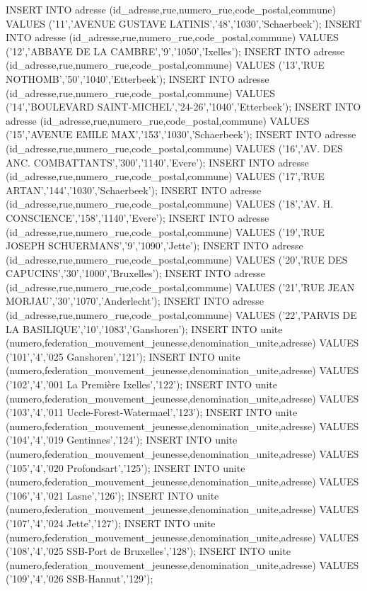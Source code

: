 INSERT INTO adresse (id_adresse,rue,numero_rue,code_postal,commune) VALUES ('11','AVENUE GUSTAVE LATINIS','48','1030','Schaerbeek');
INSERT INTO adresse (id_adresse,rue,numero_rue,code_postal,commune) VALUES ('12','ABBAYE DE LA CAMBRE','9','1050','Ixelles');
INSERT INTO adresse (id_adresse,rue,numero_rue,code_postal,commune) VALUES ('13','RUE NOTHOMB','50','1040','Etterbeek');
INSERT INTO adresse (id_adresse,rue,numero_rue,code_postal,commune) VALUES ('14','BOULEVARD SAINT-MICHEL','24-26','1040','Etterbeek');
INSERT INTO adresse (id_adresse,rue,numero_rue,code_postal,commune) VALUES ('15','AVENUE EMILE MAX','153','1030','Schaerbeek');
INSERT INTO adresse (id_adresse,rue,numero_rue,code_postal,commune) VALUES ('16','AV. DES ANC. COMBATTANTS','300','1140','Evere');
INSERT INTO adresse (id_adresse,rue,numero_rue,code_postal,commune) VALUES ('17','RUE ARTAN','144','1030','Schaerbeek');
INSERT INTO adresse (id_adresse,rue,numero_rue,code_postal,commune) VALUES ('18','AV. H. CONSCIENCE','158','1140','Evere');
INSERT INTO adresse (id_adresse,rue,numero_rue,code_postal,commune) VALUES ('19','RUE JOSEPH SCHUERMANS','9','1090','Jette');
INSERT INTO adresse (id_adresse,rue,numero_rue,code_postal,commune) VALUES ('20','RUE DES CAPUCINS','30','1000','Bruxelles');
INSERT INTO adresse (id_adresse,rue,numero_rue,code_postal,commune) VALUES ('21','RUE JEAN MORJAU','30','1070','Anderlecht');
INSERT INTO adresse (id_adresse,rue,numero_rue,code_postal,commune) VALUES ('22','PARVIS DE LA BASILIQUE','10','1083','Ganshoren');
INSERT INTO unite (numero,federation_mouvement_jeunesse,denomination_unite,adresse) VALUES ('101','4','025 Ganshoren','121');
INSERT INTO unite (numero,federation_mouvement_jeunesse,denomination_unite,adresse) VALUES ('102','4','001 La Première Ixelles','122');
INSERT INTO unite (numero,federation_mouvement_jeunesse,denomination_unite,adresse) VALUES ('103','4','011 Uccle-Forest-Watermael','123');
INSERT INTO unite (numero,federation_mouvement_jeunesse,denomination_unite,adresse) VALUES ('104','4','019 Gentinnes','124');
INSERT INTO unite (numero,federation_mouvement_jeunesse,denomination_unite,adresse) VALUES ('105','4','020 Profondsart','125');
INSERT INTO unite (numero,federation_mouvement_jeunesse,denomination_unite,adresse) VALUES ('106','4','021 Lasne','126');
INSERT INTO unite (numero,federation_mouvement_jeunesse,denomination_unite,adresse) VALUES ('107','4','024 Jette','127');
INSERT INTO unite (numero,federation_mouvement_jeunesse,denomination_unite,adresse) VALUES ('108','4','025 SSB-Port de Bruxelles','128');
INSERT INTO unite (numero,federation_mouvement_jeunesse,denomination_unite,adresse) VALUES ('109','4','026 SSB-Hannut','129');
